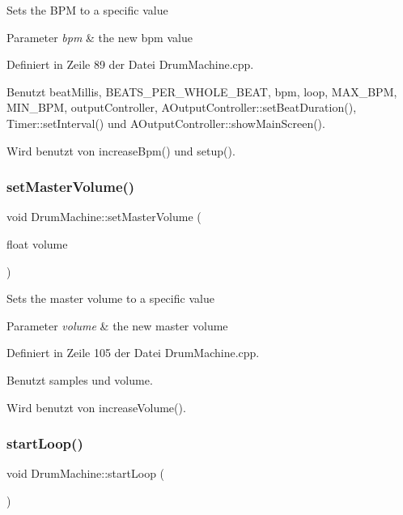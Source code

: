 Sets the B\+PM to a specific value 
\begin{DoxyParams}{Parameter}
{\em bpm} & the new bpm value \\
\hline
\end{DoxyParams}


Definiert in Zeile 89 der Datei Drum\+Machine.\+cpp.



Benutzt beat\+Millis, B\+E\+A\+T\+S\+\_\+\+P\+E\+R\+\_\+\+W\+H\+O\+L\+E\+\_\+\+B\+E\+AT, bpm, loop, M\+A\+X\+\_\+\+B\+PM, M\+I\+N\+\_\+\+B\+PM, output\+Controller, A\+Output\+Controller\+::set\+Beat\+Duration(), Timer\+::set\+Interval() und A\+Output\+Controller\+::show\+Main\+Screen().



Wird benutzt von increase\+Bpm() und setup().

\mbox{\label{class_drum_machine_a19af9f5fbe3242cee5685f1ede574a26}} 
\subsubsection{\texorpdfstring{set\+Master\+Volume()}{setMasterVolume()}}
{\footnotesize\ttfamily void Drum\+Machine\+::set\+Master\+Volume (\begin{DoxyParamCaption}\item[{float}]{volume }\end{DoxyParamCaption})}

Sets the master volume to a specific value 
\begin{DoxyParams}{Parameter}
{\em volume} & the new master volume \\
\hline
\end{DoxyParams}


Definiert in Zeile 105 der Datei Drum\+Machine.\+cpp.



Benutzt samples und volume.



Wird benutzt von increase\+Volume().

\mbox{\label{class_drum_machine_ac42508031bbf331d41c8004ed663c1c1}} 
\subsubsection{\texorpdfstring{start\+Loop()}{startLoop()}}
{\footnotesize\ttfamily void Drum\+Machine\+::start\+Loop (\begin{DoxyParamCaption}{ }\end{DoxyParamCaption})}

